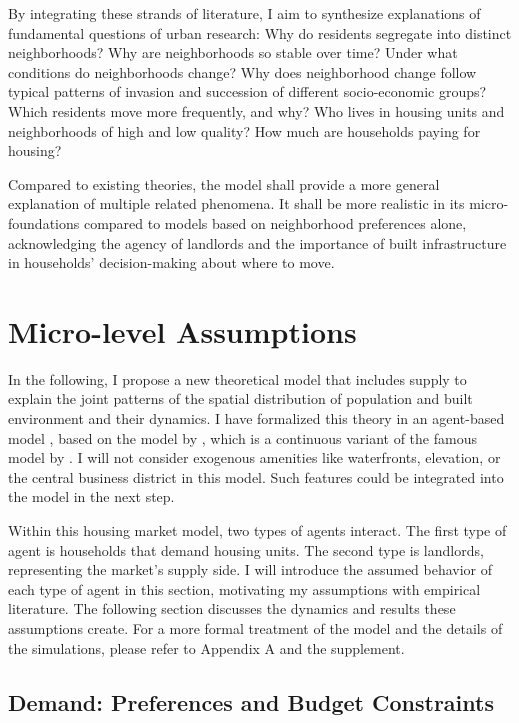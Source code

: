 \documentclass[a4paper,12pt]{article}
\begin{document}
By integrating these strands of literature, I aim to synthesize explanations of fundamental questions of urban research: Why do residents segregate into distinct neighborhoods? Why are neighborhoods so stable over time? Under what conditions do neighborhoods change? Why does neighborhood change follow typical patterns of invasion and succession of different socio-economic groups? Which residents move more frequently, and why? Who lives in housing units and neighborhoods of high and low quality? How much are households paying for housing?

Compared to existing theories, the model shall provide a more general explanation of multiple related phenomena. It shall be more realistic in its micro-foundations compared to models based on neighborhood preferences alone, acknowledging the agency of landlords and the importance of built infrastructure in households' decision-making about where to move.


\section{Micro-level Assumptions}

In the following, I propose a new theoretical model that includes supply to explain the joint patterns of the spatial distribution of population and built environment and their dynamics. I have formalized this theory in an agent-based model \citep{macyFactorsActorsComputational2002, axtellAgentBasedModelingEconomics2025}, based on the model by \citet{benardWealthStatusBasedModel2007}, which is a continuous variant of the famous model by \citet{schellingDynamicModelsSegregation1971}.  I will not consider exogenous amenities like waterfronts, elevation, or the central business district in this model. Such features could be integrated into the model in the next step.

Within this housing market model, two types of agents interact. The first type of agent is households that demand housing units. The second type is landlords, representing the market's supply side. I will introduce the assumed behavior of each type of agent in this section, motivating my assumptions with empirical literature. The following section discusses the dynamics and results these assumptions create. For a more formal treatment of the model and the details of the simulations, please refer to Appendix A and the supplement.


\subsection{Demand: Preferences and Budget Constraints}
\end{document}
